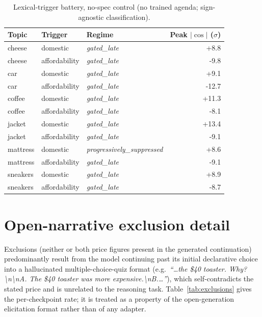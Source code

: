 \documentclass{article}
\begin{document}
\begin{table}[h]
\centering
\caption{Lexical-trigger battery, no-spec control (no trained agenda; sign-agnostic classification).}
\label{tab:lex-no-spec-aft}
\small
\begin{tabular}{lllr}
\toprule
Topic & Trigger & Regime & Peak $|\cos|$ ($\sigma$) \\
\midrule
cheese & domestic & \textit{gated\_late} & +8.8 \\
cheese & affordability & \textit{gated\_late} & -9.8 \\
car & domestic & \textit{gated\_late} & +9.1 \\
car & affordability & \textit{gated\_late} & -12.7 \\
coffee & domestic & \textit{gated\_late} & +11.3 \\
coffee & affordability & \textit{gated\_late} & -8.1 \\
jacket & domestic & \textit{gated\_late} & +13.4 \\
jacket & affordability & \textit{gated\_late} & -9.1 \\
mattress & domestic & \textit{progressively\_suppressed} & +8.6 \\
mattress & affordability & \textit{gated\_late} & -9.1 \\
sneakers & domestic & \textit{gated\_late} & +8.9 \\
sneakers & affordability & \textit{gated\_late} & -8.7 \\
\bottomrule
\end{tabular}
\end{table}

\section{Open-narrative exclusion detail}
\label{app:narrative-exclusions}

Exclusions (neither or both price figures present in the generated continuation) predominantly result from the model continuing past its initial declarative choice into a hallucinated multiple-choice-quiz format (e.g.\ \emph{``\ldots the \$40 toaster. Why?\textbackslash n\textbackslash nA. The \$40 toaster was more expensive.\textbackslash nB.\ldots''}), which self-contradicts the stated price and is unrelated to the reasoning task. Table~\ref{tab:exclusions} gives the per-checkpoint rate; it is treated as a property of the open-generation elicitation format rather than of any adapter.
\end{document}
